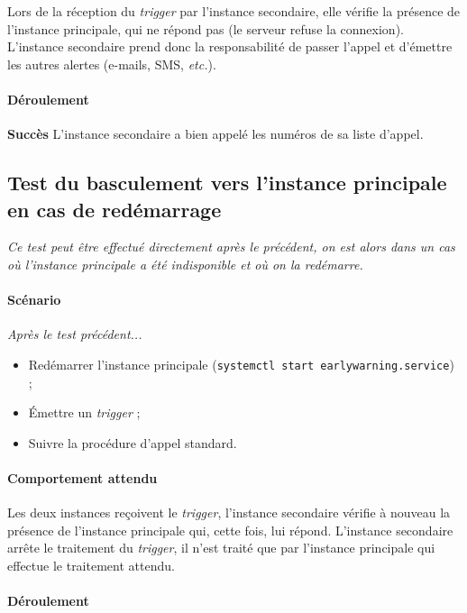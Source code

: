 \documentclass{article}
\begin{document}
Lors de la réception du \emph{trigger} par l'instance secondaire, elle vérifie la présence de l'instance principale, qui ne répond pas (le serveur refuse la connexion). L'instance secondaire prend donc la responsabilité de passer l'appel et d'émettre les autres alertes (e-mails, SMS, \emph{etc.}). 

\paragraph{Déroulement\\}

\textbf{Succès} L'instance secondaire a bien appelé les numéros de sa liste d'appel.

\subsection{Test du basculement vers l'instance principale en cas de redémarrage}

\textit{Ce test peut être effectué directement après le précédent, on est alors dans un cas où l'instance principale a été indisponible et où on la redémarre.}

\paragraph{Scénario}

\textit{Après le test précédent...}

\begin{itemize}
    \item Redémarrer l'instance principale (\texttt{systemctl start earlywarning.service}) ;
    \item Émettre un \emph{trigger} ;
    \item Suivre la procédure d'appel standard.
\end{itemize}

\paragraph{Comportement attendu\\}

Les deux instances reçoivent le \emph{trigger}, l'instance secondaire vérifie à nouveau la présence de l'instance principale qui, cette fois, lui répond. L'instance secondaire arrête le traitement du \emph{trigger}, il n'est traité que par l'instance principale qui effectue le traitement attendu.

\paragraph{Déroulement\\}
\end{document}
